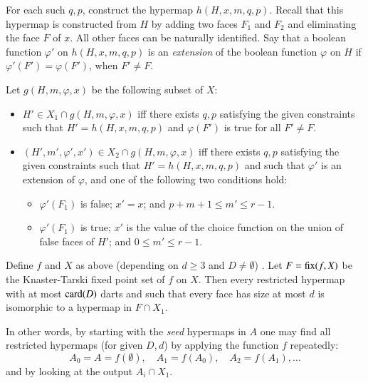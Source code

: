 For each such $q,p$, construct the hypermap $h(H,x,m,q,p)$.  Recall that this hypermap is constructed from $H$ by adding two faces $F_1$ and $F_2$ and eliminating the face $F$ of $x$.  All other faces can be naturally identified.  Say that a boolean function $\varphi'$ on $h(H,x,m,q,p)$ is an {\it extension} of the boolean function $\varphi$ on $H$ if $\varphi'(F') =\varphi(F')$, when $F'\ne F$.  

Let $g(H,m,\varphi,x)$ be the following subset of $X$:
\begin{itemize}
\item $H'\in X_1\cap g(H,m,\varphi,x)$ iff there exists $q,p$ satisfying the given constraints such that $H'=h(H,x,m,q,p)$ and $\varphi(F')$ is true for all $F'\ne F$.
\item $(H',m',\varphi',x')\in X_2\cap g(H,m,\varphi,x)$ iff there exists $q,p$ satisfying the given constraints such that $H'=h(H,x,m,q,p)$ and such that $\varphi'$ is an extension of $\varphi$, and one of the following two conditions hold:
  \begin{itemize}
    \item $\varphi'(F_1)$ is false;  $x' = x$; and  $p+m+1 \le m' \le r-1$.
     \item $\varphi'(F_1)$ is true; $x'$ is the value of the choice function on the union of false faces of $H'$; and $0 \le m' \le r-1$.
  \end{itemize}
\end{itemize}



\begin{lemma}  
Define $f $ and $X$ as above (depending on $d\ge 3$ and $D\ne \emptyset$) .   Let $F={\operatorname{fix}}(f,X)$ be the Knaster-Tarski fixed point set of $f$ on $X$.   Then every restricted hypermap with at most ${\operatorname{card}}(D)$ darts and such that every face has size at most $d$ is isomorphic to a hypermap in $F\cap X_1$.
\end{lemma}

In other words, by starting with the {\it seed} hypermaps in $A$ one may find all restricted hypermaps (for given $D,d$) by applying the function $f$ repeatedly:
$$
A_0 = A = f(\emptyset),\quad A_1 = f(A_0),\quad A_2 = f(A_1),\ldots
$$
and by looking at the output $A_i \cap X_1$.

